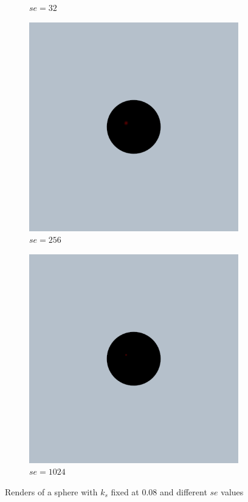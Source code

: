 \documentclass{article}
\begin{document}
\begin{figure}[h]
\begin{subfigure}{0.2\textwidth}
		\caption{$se = 32$}
		\label{fig:specular_0_08_32}
	\end{subfigure}%
	\hfill
	\begin{subfigure}{0.2\textwidth}
		\includegraphics[width=\textwidth]{specular_sc_0_08_se_256}
		\caption{$se = 256$}
		\label{fig:specular_0_08_256}
	\end{subfigure}%
	\hfill
	\begin{subfigure}{0.2\textwidth}
		\includegraphics[width=\textwidth]{specular_sc_0_08_se_1024}
		\caption{$se = 1024$}
		\label{fig:specular_0_08_1024}
	\end{subfigure}%
	\hfill
	
	\caption{Renders of a sphere with $k_{s}$ fixed at $0.08$ and different $se$ values}
	\label{fig:specular_0_08}
\end{figure}
\end{document}
